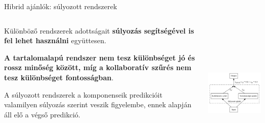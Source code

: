 \documentclass[english, aspectratio=169]{beamer}
\begin{document}
\begin{frame}{Hibrid ajánlók: súlyozott rendszerek}
\begin{columns}
\begin{column}{.5\textwidth}
Különböző rendszerek adottságait \textbf{súlyozás segítségével is fel lehet használni} együttesen.\par\smallskip
\textbf{A tartalomalapú rendszer nem tesz különbséget jó és rossz minőség között, míg a kollaboratív szűrés nem tesz különbséget fontosságban}.\par\smallskip
A súlyozott rendszerek a komponenseik predikcióit valamilyen súlyozás szerint veszik figyelembe, ennek alapján áll elő a végső predikció. 
\end{column}
\begin{column}{.5\textwidth}
\begin{center}
\includegraphics[width=7cm, height=7cm, keepaspectratio]{graphs/recommender_15.png}
\end{center}
\end{column}
\end{columns}
\end{frame}
\end{document}
